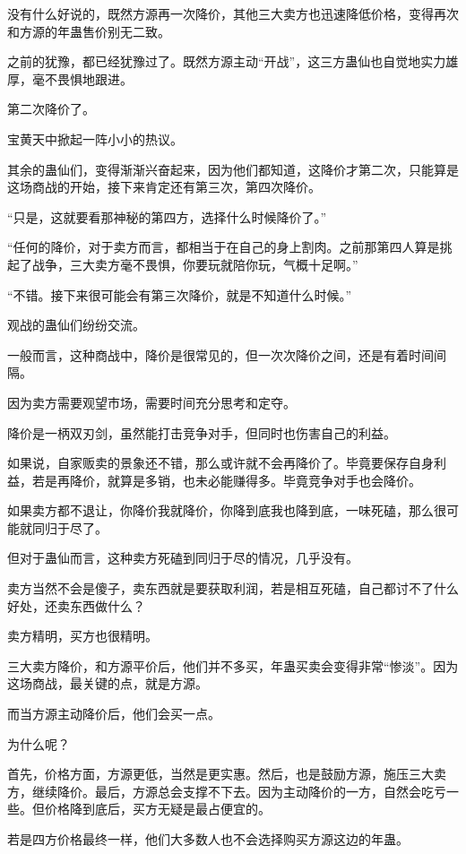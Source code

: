 \begin{this_body}
没有什么好说的，既然方源再一次降价，其他三大卖方也迅速降低价格，变得再次和方源的年蛊售价别无二致。

之前的犹豫，都已经犹豫过了。既然方源主动“开战”，这三方蛊仙也自觉地实力雄厚，毫不畏惧地跟进。

第二次降价了。

宝黄天中掀起一阵小小的热议。

其余的蛊仙们，变得渐渐兴奋起来，因为他们都知道，这降价才第二次，只能算是这场商战的开始，接下来肯定还有第三次，第四次降价。

“只是，这就要看那神秘的第四方，选择什么时候降价了。”

“任何的降价，对于卖方而言，都相当于在自己的身上割肉。之前那第四人算是挑起了战争，三大卖方毫不畏惧，你要玩就陪你玩，气概十足啊。”

“不错。接下来很可能会有第三次降价，就是不知道什么时候。”

观战的蛊仙们纷纷交流。

一般而言，这种商战中，降价是很常见的，但一次次降价之间，还是有着时间间隔。

因为卖方需要观望市场，需要时间充分思考和定夺。

降价是一柄双刃剑，虽然能打击竞争对手，但同时也伤害自己的利益。

如果说，自家贩卖的景象还不错，那么或许就不会再降价了。毕竟要保存自身利益，若是再降价，就算是多销，也未必能赚得多。毕竟竞争对手也会降价。

如果卖方都不退让，你降价我就降价，你降到底我也降到底，一味死磕，那么很可能就同归于尽了。

但对于蛊仙而言，这种卖方死磕到同归于尽的情况，几乎没有。

卖方当然不会是傻子，卖东西就是要获取利润，若是相互死磕，自己都讨不了什么好处，还卖东西做什么？

卖方精明，买方也很精明。

三大卖方降价，和方源平价后，他们并不多买，年蛊买卖会变得非常“惨淡”。因为这场商战，最关键的点，就是方源。

而当方源主动降价后，他们会买一点。

为什么呢？

首先，价格方面，方源更低，当然是更实惠。然后，也是鼓励方源，施压三大卖方，继续降价。最后，方源总会支撑不下去。因为主动降价的一方，自然会吃亏一些。但价格降到底后，买方无疑是最占便宜的。

若是四方价格最终一样，他们大多数人也不会选择购买方源这边的年蛊。


\end{this_body}
